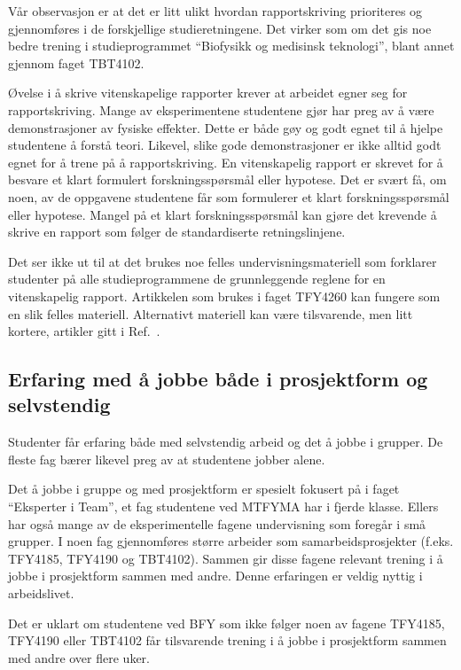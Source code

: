 \documentclass{article}
\begin{document}
Vår observasjon er at det er litt ulikt hvordan rapportskriving prioriteres og gjennomføres i de forskjellige studieretningene. Det virker som om det gis noe bedre trening i studieprogrammet ``Biofysikk og medisinsk teknologi'', blant annet gjennom faget TBT4102.

Øvelse i å skrive vitenskapelige rapporter krever at arbeidet egner seg for rapportskriving. Mange av eksperimentene studentene gjør har preg av å være demonstrasjoner av fysiske effekter. Dette er både gøy og godt egnet til å hjelpe studentene å forstå teori. Likevel, slike gode demonstrasjoner er ikke alltid godt egnet for å trene på å rapportskriving. En vitenskapelig rapport er skrevet for å besvare et klart formulert forskningsspørsmål eller hypotese. Det er svært få, om noen, av de oppgavene studentene får som formulerer et klart forskningsspørsmål eller hypotese. Mangel på et klart forskningsspørsmål kan gjøre det krevende å skrive en rapport som følger de standardiserte retningslinjene.

Det ser ikke ut til at det brukes noe felles undervisningsmateriell som forklarer studenter på alle studieprogrammene de grunnleggende reglene for en vitenskapelig rapport. Artikkelen som brukes i faget TFY4260 kan fungere som en slik felles materiell. Alternativt materiell kan være tilsvarende, men litt kortere, artikler gitt i Ref.~\cite{Lapin1994,Senturia2003}.

\subsection{Erfaring med å jobbe både i prosjektform og selvstendig}
Studenter får erfaring både med selvstendig arbeid og det å jobbe i grupper. De fleste fag bærer likevel preg av at studentene jobber alene.

Det å jobbe i gruppe og med prosjektform er spesielt fokusert på i faget ``Eksperter i Team'', et fag studentene ved MTFYMA har i fjerde klasse. Ellers har også mange av de eksperimentelle fagene undervisning som foregår i små grupper. I noen fag gjennomføres større arbeider som samarbeidsprosjekter (f.eks. TFY4185, TFY4190 og TBT4102). Sammen gir disse fagene relevant trening i å jobbe i prosjektform sammen med andre. Denne erfaringen er veldig nyttig i arbeidslivet.

Det er uklart om studentene ved BFY som ikke følger noen av fagene TFY4185, TFY4190 eller TBT4102 får tilsvarende trening i å jobbe i prosjektform sammen med andre over flere uker.
\end{document}
